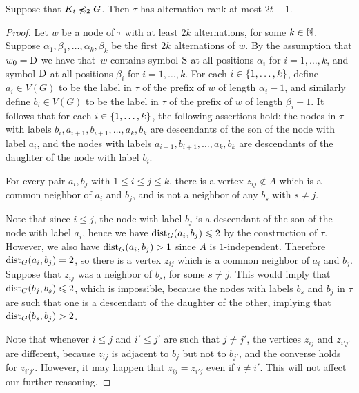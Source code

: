 \begin{lemma}\label{thm:alternation-rank-type-tree}
Suppose that  $K_t\not\preccurlyeq_{2} G$.
Then $\tau$ has alternation rank at most $2t-1$.
\end{lemma}
\begin{proof}
	Let $w$ be a node of $\tau$ with at least $2k$ alternations, for some $k\in \mathbb{N}$.
	Suppose $\alpha_1,\beta_1,\ldots,\alpha_k,\beta_k$ be the first $2k$ alternations of $w$.
	By the assumption that $w_0=\mathrm{D}$ we have that~$w$ contains symbol $\mathrm{S}$ at all positions $\alpha_i$ for $i=1,\ldots,k$, and symbol $\mathrm{D}$ at all positions $\beta_i$ for $i=1,\ldots,k$.
	For each $i\in \{1,\ldots,k\}$, define $a_i\in V(G)$ to be the label in $\tau$ of the prefix of $w$ of length $\alpha_i-1$, and similarly define $b_i\in V(G)$ to be the label in $\tau$ of the prefix of $w$
	of length $\beta_i-1$. 
	It follows that for each $i\in \{1,\ldots,k\}$, the following assertions hold:
	the nodes in $\tau$ with labels $b_i,a_{i+1},b_{i+1},\ldots,a_k,b_k$ are  descendants of the son of the node with label $a_i$,
	and the nodes with labels $a_{i+1},b_{i+1},\ldots,a_k,b_k$
	are descendants of the daughter of the node with label $b_i$.
	
	\begin{claim}\label{claim:minor}
		For every pair $a_i,b_j$ with $1\le i\le j\le k$, there is a vertex $z_{ij}\not\in A$	 which is a common neighbor of $a_i$ and $b_j$,
		and is not a neighbor of any $b_s$ with $s\neq j$.
	\end{claim}
	\begin{clproof}
		Note that since $i\le j$, the node with label $b_j$ is a descendant of the son of the node with label $a_i$, hence we have $\mathrm{dist}_G(a_i,b_j)\leqslant 2$ by the construction of $\tau$.
		However, we also have $\mathrm{dist}_G(a_i,b_j)>1$ since $A$
		is $1$-independent. Therefore $\mathrm{dist}_G(a_i,b_j)=2$, so there is a vertex $z_{ij}$ which is a common neighbor of $a_i$ and $b_j$. 
		Suppose that $z_{ij}$ was a neighbor of $b_s$, for some $s\neq j$. This would imply that $\mathrm{dist}_G(b_j,b_s)\leqslant 2$, which is impossible, 
because
		 the nodes with labels $b_s$ and $b_j$ in $\tau$ are such that one is a descendant of the daughter of the other, implying that $\mathrm{dist}_G(b_s,b_j)>2$.
	\end{clproof}
  
Note that whenever $i\leq j$ and $i'\leq j'$ are such that $j\neq j'$, the vertices $z_{ij}$ and $z_{i'j'}$ are different, because $z_{ij}$ is adjacent to $b_{j}$ but not to $b_{j'}$, and the converse holds for $z_{i'j'}$.
However, it may happen that $z_{ij}=z_{i'j}$ even if $i\neq i'$. This will not affect our further reasoning.


\end{proof}
